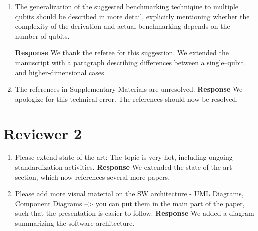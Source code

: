 \documentclass[a4paper,12pt]{article}
\newcommand{\1}{{\rm 1\hspace{-0.9mm}l}}
\newenvironment{response}{\vspace{1em}\noindent\textbf{Response}}{\vspace{1em}}
\begin{document}
\begin{enumerate}
    \begin{response}
      We modified manuscript to include mention of cross-entropy benchmarking
      as suggested by the referee.
    \end{response}
  \item The generalization of the suggested benchmarking techniqiue to multiple
    qubits should be described in more detail, explicitly mentioning whether
    the complexity of the derivation and actual benchmarking depends on the
    number of qubits.

    \begin{response}
      We thank the referee for this suggestion. We extended the manuscript with
      a paragraph describing differences between a single--qubit and
      higher-dimensional cases.
    \end{response}
  \item The references in Supplementary Materials are unresolved.
    \begin{response}
      We apologize for this technical error. The references should now be resolved.
    \end{response}
\end{enumerate}
\section{Reviewer 2}
\begin{enumerate}
  \item Please extend state-of-the-art: The topic is very hot, including ongoing
    standardization activities.
    \begin{response}
      We extended the state-of-the-art section, which now references several more papers.
    \end{response}
    \item Please add more visual material on the SW architecture - UML Diagrams, Component
      Diagrams --> you can put them in the main part of the paper, such
      that the presentation is easier to follow.
    \begin{response}
      We added a diagram summarizing the software architecture.
    \end{response}
\end{enumerate}
\end{document}
